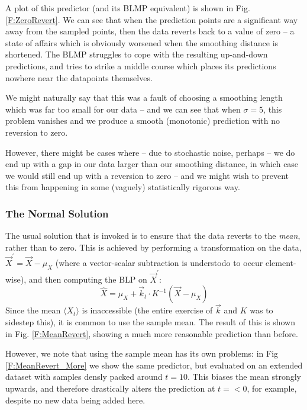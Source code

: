 \documentclass{article}
\newcounter{version}
\begin{document}
			A plot of this predictor (and its BLMP equivalent) is shown in Fig. \ref{F:ZeroRevert}. We can see that when the prediction points are a significant way away from the sampled points, then the data reverts back to a value of zero -- a state of affairs which is obviously worsened when the smoothing distance is shortened. The BLMP struggles to cope with the resulting up-and-down predictions, and tries to strike a middle course which places its predictions nowhere near the datapoints themselves. 

			We might naturally say that this was a fault of choosing a smoothing length which was far too small for our data -- and we can see that when $\sigma = 5$, this problem vanishes and we produce a smooth (monotonic) prediction with no reversion to zero. 

			However, there might be cases where -- due to stochastic noise, perhaps -- we do end up with a gap in our data larger than our smoothing distance, in which case we would still end up with a reversion to zero -- and we might wish to prevent this from happening in some (vaguely) statistically rigorous way. 
			
		\subsubsection*{The Normal Solution}
			The usual solution that is invoked is to ensure that the data reverts to the \textit{mean}, rather than to zero. This is achieved by performing a transformation on the data, $\vec{X}^\prime = \vec{X} - \mu_X$ (where a vector-scalar subtraction is understodo to occur element-wise), and then computing the BLP on $\vec{X}^\prime$:
			\begin{equation}
				\hat{X} = \mu_X + \vec{k}_t \cdot K^{-1} \left( \vec{X} - \mu_X\right)
			\end{equation} 
			Since the mean $\langle X_t \rangle$ is inaccessible (the entire exercise of $\vec{k}$ and $K$ was to sidestep this), it is common to use the sample mean. The result of this is shown in Fig. \ref{F:MeanRevert}, showing a much more reasonable prediction than before. 
			
			However, we note that using the sample mean has its own problems: in Fig \ref{F:MeanRevert_More} we show the same predictor, but evaluated on an extended dataset with samples densly packed around $t = 10$. This biases the mean strongly upwards, and therefore drastically alters the prediction at $t = < 0$, for example, despite no new data being added here. 
\end{document}

